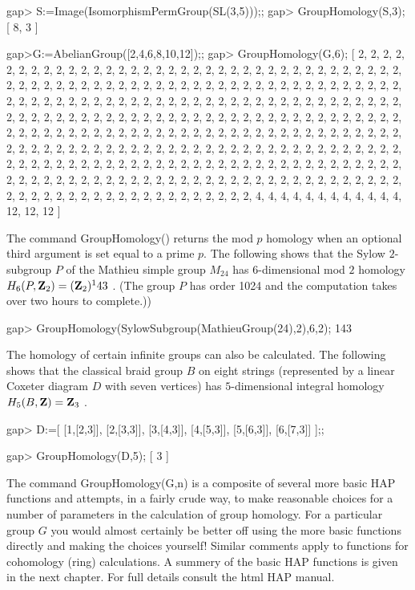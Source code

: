 gap> S:=Image(IsomorphismPermGroup(SL(3,5)));;
gap> GroupHomology(S,3);
[ 8, 3 ]

gap>G:=AbelianGroup([2,4,6,8,10,12]);;
gap> GroupHomology(G,6);
[ 2, 2, 2, 2, 2, 2, 2, 2, 2, 2, 2, 2, 2, 2, 2, 2, 2, 2, 2, 2, 2, 2, 2, 2, 2,
  2, 2, 2, 2, 2, 2, 2, 2, 2, 2, 2, 2, 2, 2, 2, 2, 2, 2, 2, 2, 2, 2, 2, 2, 2,
  2, 2, 2, 2, 2, 2, 2, 2, 2, 2, 2, 2, 2, 2, 2, 2, 2, 2, 2, 2, 2, 2, 2, 2, 2,
  2, 2, 2, 2, 2, 2, 2, 2, 2, 2, 2, 2, 2, 2, 2, 2, 2, 2, 2, 2, 2, 2, 2, 2, 2,
  2, 2, 2, 2, 2, 2, 2, 2, 2, 2, 2, 2, 2, 2, 2, 2, 2, 2, 2, 2, 2, 2, 2, 2, 2,
  2, 2, 2, 2, 2, 2, 2, 2, 2, 2, 2, 2, 2, 2, 2, 2, 2, 2, 2, 2, 2, 2, 2, 2, 2,
  2, 2, 2, 2, 2, 2, 2, 2, 2, 2, 2, 2, 2, 2, 2, 2, 2, 2, 2, 2, 2, 2, 2, 2, 2,
  2, 2, 2, 2, 2, 2, 2, 2, 2, 2, 2, 2, 2, 2, 2, 2, 2, 2, 2, 2, 2, 2, 2, 2, 2,
  2, 2, 2, 2, 2, 2, 2, 2, 2, 2, 2, 2, 2, 2, 2, 2, 2, 2, 2, 2, 2, 2, 2, 2, 2,
  2, 2, 2, 2, 2, 2, 2, 2, 2, 2, 2, 2, 2, 2, 2, 2, 2, 2, 2, 2, 2, 2, 2, 2, 2,
  2, 2, 2, 2, 2, 2, 2, 2, 2, 2, 2, 2, 2, 2, 2, 2, 2, 2, 2, 2, 2, 2, 2, 2, 2,
  2, 2, 2, 2, 2, 4, 4, 4, 4, 4, 4, 4, 4, 4, 4, 4, 4, 12, 12, 12 ]
\endexample

The command {\sf GroupHomology()}
returns the mod $p$ homology when an optional third argument is set equal to a 
prime $p$. The following shows that the Sylow 
$2$-subgroup $P$ of the Mathieu simple group $M_{24}$ has $6$-dimensional mod 
$2$ homology $H_6(P,{\bf Z}_2)=({\bf Z}_2)^143$ . 
(The group $P$ has order 1024 and the computation takes over two hours to 
complete.))

\beginexample
gap> GroupHomology(SylowSubgroup(MathieuGroup(24),2),6,2);
143
\endexample

The homology of certain infinite groups can also be calculated. The following shows that the classical braid group $B$
on eight strings (represented by a linear Coxeter diagram $D$
with seven vertices) has $5$-dimensional integral homology $H_5(B,{\bf Z}) = 
{\bf Z}_3$ .

\beginexample
gap> D:=[  [1,[2,3]],  [2,[3,3]],  [3,[4,3]],  [4,[5,3]],  [5,[6,3]],  [6,[7,3]]  ];;

gap> GroupHomology(D,5);
[ 3 ]
\endexample

The command {\sf GroupHomology(G,n)}
is a composite of several more basic {\sf HAP}
functions and attempts, in a fairly crude way, to make reasonable choices 
for a number of parameters in the calculation of group homology. For a 
particular group $G$ you would almost certainly be better off 
using the more basic functions directly and making the choices yourself! 
Similar comments apply to functions for cohomology (ring) calculations. A summery of the basic {\sf HAP} functions is given in the next chapter. For full details consult the html {\sf HAP} manual.

